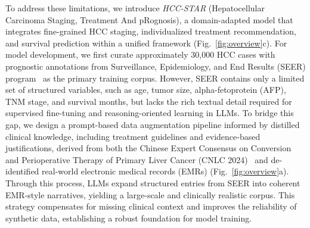\documentclass{article}
\begin{document}
To address these limitations, we introduce \textit{HCC-STAR} (Hepatocellular Carcinoma Staging, Treatment And pRognosis), a domain-adapted model that integrates fine-grained HCC staging, individualized treatment recommendation, and survival prediction within a unified framework (Fig.~\ref{fig:overview}c). For model development, we first curate approximately 30{,}000 HCC cases with prognostic annotations from Surveillance, Epidemiology,
and End Results (SEER) program~\cite{seer_overview} as the primary training corpus. However, SEER contains only a limited set of structured variables, such as age, tumor size, alpha-fetoprotein (AFP), TNM stage, and survival months, but lacks the rich textual detail required for supervised fine-tuning and reasoning-oriented learning in LLMs. To bridge this gap, we design a prompt-based data augmentation pipeline informed by distilled clinical knowledge, including treatment guidelines and evidence-based justifications, derived from both the Chinese Expert Consensus on Conversion and Perioperative Therapy of Primary Liver Cancer (CNLC 2024)~\cite{jia2024chinese} and de-identified real-world electronic medical records (EMRs) (Fig.~\ref{fig:overview}a). Through this process, LLMs expand structured entries from SEER into coherent EMR-style narratives, yielding a large-scale and clinically realistic corpus. This strategy compensates for missing clinical context and improves the reliability of synthetic data, establishing a robust foundation for model training.






\end{document}
